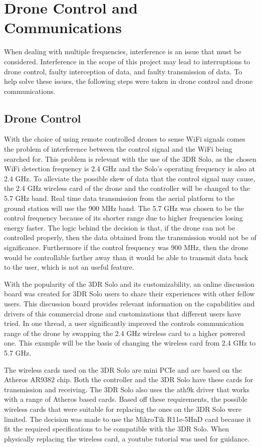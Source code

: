 \section{Drone Control and Communications}
When dealing with multiple frequencies, interference is an issue that must be considered. Interference in the scope of this project may lead to interruptions to drone control, faulty interception of data, and faulty transmission of data. To help solve these issues, the following steps were taken in drone control and drone communications.\par 

\subsection{Drone Control}
With the choice of using remote controlled drones to sense WiFi signals comes the problem of interference between the control signal and the WiFi being searched for. This problem is relevant with the use of the 3DR Solo, as the chosen WiFi detection frequency is 2.4 GHz and the Solo’s operating frequency is also at 2.4 GHz. To alleviate the possible skew of data that the control signal may cause, the 2.4 GHz wireless card of the drone and the controller will be changed to the 5.7 GHz band. Real time data transmission from the aerial platform to the ground station will use the 900 MHz band. The 5.7 GHz was chosen to be the control frequency because of its shorter range due to higher frequencies losing energy faster. The logic behind the decision is that, if the drone can not be controlled properly, then the data obtained from the transmission would not be of significance. Furthermore if the control frequency was 900 MHz, then the drone would be controllable farther away than it would be able to transmit data back to the user, which is not an useful feature.\par 
With the popularity of the 3DR Solo and its customizability, an online discussion board was created for 3DR Solo users to share their experiences with other fellow users. This discussion board provides relevant information on the capabilities and drivers of this commercial drone and customizations that different users have tried. In one thread, a user significantly improved the controls communication range of the drone by swapping the 2.4 GHz wireless card to a higher powered one. This example will be the basis of changing the wireless card from 2.4 GHz to 5.7 GHz.\par 
The wireless cards used on the 3DR Solo are mini PCIe and are based on the Atheros AR9382 chip. Both the controller and the 3DR Solo have these cards for transmission and receiving. The 3DR Solo also uses the ath9k driver that works with a range of Atheros based cards. Based off these requirements, the possible wireless cards that were suitable for replacing the ones on the 3DR Solo were limited. The decision was made to use the MikroTik R11e-5HnD card because it fit the required specifications to be compatible with the 3DR Solo. When physically replacing the wireless card, a youtube tutorial was used for guidance.\par 

